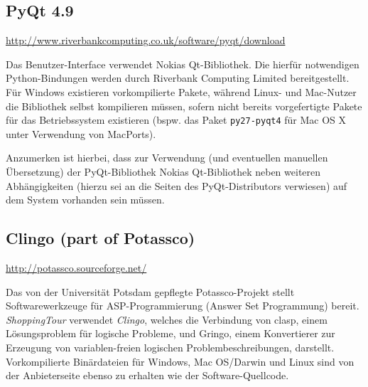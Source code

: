 \subsection{PyQt 4.9}
\url{http://www.riverbankcomputing.co.uk/software/pyqt/download}

Das Benutzer-Interface verwendet Nokias Qt-Bibliothek. Die hierfür notwendigen Python-Bindungen werden durch Riverbank Computing Limited bereitgestellt. Für Windows existieren vorkompilierte Pakete, während Linux- und Mac-Nutzer die Bibliothek selbst kompilieren müssen, sofern nicht bereits vorgefertigte Pakete für das Betriebssystem existieren (bspw. das Paket \texttt{py27-pyqt4} für Mac OS X unter Verwendung von MacPorts).

Anzumerken ist hierbei, dass zur Verwendung (und eventuellen manuellen Übersetzung) der PyQt-Bibliothek Nokias Qt-Bibliothek neben weiteren Abhängigkeiten (hierzu sei an die Seiten des PyQt-Distributors verwiesen) auf dem System vorhanden sein müssen.

\subsection{Clingo (part of Potassco)}
\url{http://potassco.sourceforge.net/}

Das von der Universität Potsdam gepflegte Potassco-Projekt stellt Softwarewerkzeuge für ASP-Programmierung (Answer Set Programmung) bereit. \emph{ShoppingTour} verwendet \emph{Clingo}, welches die Verbindung von clasp, einem Lösungsproblem für logische Probleme, und Gringo, einem Konvertierer zur Erzeugung von variablen-freien logischen Problembeschreibungen, darstellt. Vorkompilierte Binärdateien für Windows, Mac OS/Darwin und Linux sind von der Anbieterseite ebenso zu erhalten wie der Software-Quellcode.

